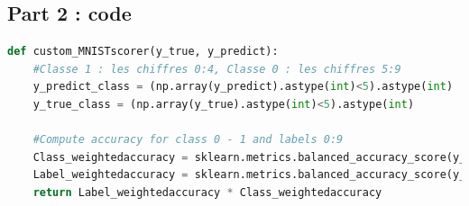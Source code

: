 \subsection{Part 2 : code}
\begin{lstlisting}[language=Python]
def custom_MNISTscorer(y_true, y_predict):
    #Classe 1 : les chiffres 0:4, Classe 0 : les chiffres 5:9
    y_predict_class = (np.array(y_predict).astype(int)<5).astype(int)
    y_true_class = (np.array(y_true).astype(int)<5).astype(int)
    
    #Compute accuracy for class 0 - 1 and labels 0:9
    Class_weightedaccuracy = sklearn.metrics.balanced_accuracy_score(y_true_class, y_predict_class)
    Label_weightedaccuracy = sklearn.metrics.balanced_accuracy_score(y_true, y_predict)
    return Label_weightedaccuracy * Class_weightedaccuracy
\end{lstlisting}
 